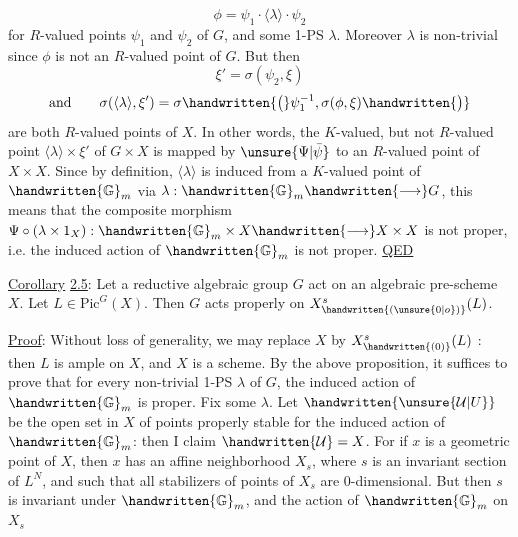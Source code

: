
\[
\phi=\psi_1\cdot\langle\lambda\rangle\cdot\psi_2
\]
for $R$-valued points $\psi_1$ and $\psi_2$ of $G$, and some 1-PS $\lambda$. Moreover $\lambda$ is non-trivial since $\phi$ is not an $R$-valued point of $G$. But then
\[
\xi'=\sigma(\psi_2,\xi)
\]
\[
\text{and}\qquad \sigma(\langle\lambda\rangle,\xi')=\sigma\handwritten{\bigl(}\psi_1^{-1},\sigma(\phi,\xi)\handwritten{\bigr)}
\]
are both $R$-valued points of $X$.
In other words, the $K$-valued, but not $R$-valued point $\langle\lambda\rangle\times\xi'$ of $G\times X$ is mapped by $\unsure{\Psi|\bar{\psi}}$ to an $R$-valued point of $X\times X$. Since by definition, $\langle\lambda\rangle$ is induced from a $K$-valued point of $\handwritten{\mathbb G}_m$ via $\lambda:\handwritten{\mathbb G}_m\handwritten{\longrightarrow}G$, this means that the composite morphism $\Psi\circ(\lambda\times1_X):\handwritten{\mathbb G}_m\times X\handwritten{\longrightarrow}X\times X$ is not proper, i.e. the induced action of $\handwritten{\mathbb G}_m$ is not proper. \uline{QED}

\uline{Corollary} \uline{2.5}: Let a reductive algebraic group $G$ act on an algebraic pre-scheme $X$. Let $L\in\mathrm{Pic}^{G}(X)$. Then $G$ acts properly on $X^s_{\handwritten{(\unsure{0|o})}}(L)$.

\uline{Proof}: Without loss of generality, we may replace $X$ by $X^s_{\handwritten{(0)}}(L)$ : then $L$ is ample on $X$, and $X$ is a scheme. By the above proposition, it suffices to prove that for every non-trivial 1-PS $\lambda$ of $G$, the induced action of $\handwritten{\mathbb G}_m$ is proper. Fix some $\lambda$. Let $\handwritten{\unsure{\mathcal U|U}}$ be the open set in $X$ of points properly stable for the induced action of $\handwritten{\mathbb G}_m$: then I claim $\handwritten{\mathcal U}=X$. For if $x$ is a geometric point of $X$, then $x$ has an affine neighborhood $X_s$, where $s$ is an invariant section of $L^N$, and such that all stabilizers of points of $X_s$ are 0-dimensional. But then $s$ is invariant under $\handwritten{\mathbb G}_m$, and the action of $\handwritten{\mathbb G}_m$ on $X_s$

